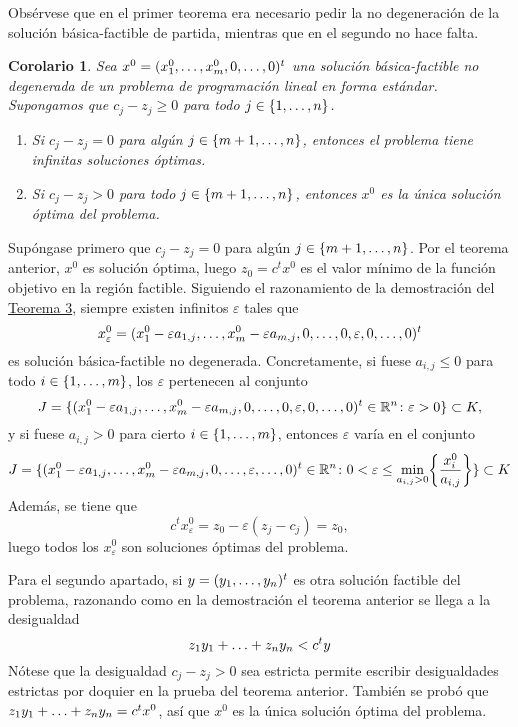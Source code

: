\documentclass[11pt]{report}
\makeatletter
\renewenvironment{proof}[1][\proofname]{\par
  \pushQED{\qed}%
  \normalfont \topsep\z@skip %
  \trivlist
  \item[\hskip\labelsep
        \itshape
    #1\@addpunct{.}]\ignorespaces
}{%
  \popQED\endtrivlist\@endpefalse
}
\theoremstyle{mytheorem}
\newtheorem{corollary}{Corolario} %
\theoremstyle{mydefinition}
\theoremstyle{myexample}
\let\oldproofname=\proofname
\renewcommand{\proofname}{\rm\bf{\oldproofname}}}
\newenvironment{ccorollary} %
  {\begin{mdframed}[
        linewidth=3pt,
        linecolor=c2,
        bottomline=false,
        topline=false,
        rightline=false,
        innerrightmargin=0pt,
        innertopmargin=0pt,
        innerbottommargin=0pt,
        innerleftmargin=1em,
        skipabove=\baselineskip]
    \begin{corollary}}
  {\end{corollary}\end{mdframed}}
\newcommand{\R}{\mathbb R}
\makeatother
\begin{document}
Obsérvese que en el primer teorema era necesario pedir la no degeneración de la solución básica-factible de partida, mientras que en el segundo no hace falta.

\begin{ccorollary}
Sea $x^0 = (x^0_1,\mathellipsis,x^0_m,0,\mathellipsis,0)^t$ una solución básica-factible no degenerada de un problema de programación lineal en forma estándar. Supongamos que $c_j-z_j \geq 0$ para todo $j \in \{1,\mathellipsis,n\}$.

\begin{enumerate}
    \item Si $c_j-z_j = 0$ para algún $j \in \{m+1,\mathellipsis,n\}$, entonces el problema tiene infinitas soluciones óptimas.
    \item Si $c_j-z_j > 0$ para todo $j \in \{m+1,\mathellipsis,n\}$, entonces $x^0$ es la única solución óptima del problema.
\end{enumerate}

\end{ccorollary}

\begin{proof} 
Supóngase primero que $c_j-z_j = 0$ para algún $j \in \{m+1,\mathellipsis,n\}$. Por el teorema anterior, $x^0$ es solución óptima, luego $z_0 = c^tx^0$ es el valor mínimo de la función objetivo en la región factible. Siguiendo el razonamiento de la demostración del \hyperref[teo2.1.]{\color{gray}Teorema 3}, siempre existen infinitos $\varepsilon$ tales que 
\[x_\varepsilon^0 = (x^0_1-\varepsilon a_{1,j},\mathellipsis,x^0_m-\varepsilon a_{m,j},0,\mathellipsis,0,\varepsilon,0,\mathellipsis,0)^t\]
es solución básica-factible no degenerada. Concretamente, si fuese $a_{i,j} \leq 0$ para todo $i \in \{1,\mathellipsis,m\}$, los $\varepsilon$ pertenecen al conjunto
\[J = \{(x^0_1-\varepsilon a_{1,j},\mathellipsis,x^0_m-\varepsilon a_{m,j},0,\mathellipsis,0,\varepsilon,0,\mathellipsis,0)^t \in \R^n \colon \varepsilon > 0\} \subset K,\]
y si fuese $a_{i,j} > 0$ para cierto $i \in \{1,\mathellipsis,m\}$, entonces $\varepsilon$ varía en el conjunto
\[J = \{(x^0_1-\varepsilon a_{1,j},\mathellipsis,x^0_m-\varepsilon a_{m,j},0,\mathellipsis,\varepsilon,\mathellipsis,0)^t \in \R^n \colon 0 < \varepsilon \leq \min_{a_{i,j} > 0} \biggl\{\frac{x_i^0}{a_{i,j}} \biggr\} \} \subset K\]
Además, se tiene que
\[c^tx_\varepsilon^0 = z_0-\varepsilon (z_j-c_j) = z_0,\]
luego todos los $x_\varepsilon^0$ son soluciones óptimas del problema.



Para el segundo apartado, si $y = (y_1,\mathellipsis,y_n)^t$ es otra solución factible del problema, razonando como en la demostración el teorema anterior se llega a la desigualdad
\[z_1y_1+\mathellipsis+z_ny_n < c^ty\]
Nótese que la desigualdad $c_j-z_j >0$ sea estricta permite escribir desigualdades estrictas por doquier en la prueba del teorema anterior. También se probó que $z_1y_1+\mathellipsis+z_ny_n = c^tx^0$, así que $x^0$ es la única solución óptima del problema.
\end{proof}
\end{document}
